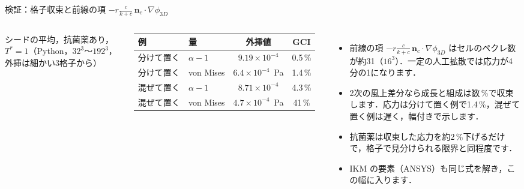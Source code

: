 \documentclass[aspectratio=169,11pt]{beamer}
\begin{document}
\begin{frame}{検証：格子収束と前線の項 $-r\tfrac{c}{k+c}\,\mathbf n_c\cdot\nabla\phi_{3D}$}
\begin{columns}[T]
\small シードの平均，抗菌薬あり，$T^*=1$（Python，$32^3$〜$192^3$，外挿は細かい3格子から）\\[4pt]
\begin{tabular}{llcc}
\toprule
例 & 量 & 外挿値 & GCI \\
\midrule
分けて置く & $\alpha-1$ & $9.19\times10^{-4}$ & 0.5\,\% \\
分けて置く & von Mises & $6.4\times10^{-4}$~Pa & 1.4\,\% \\
混ぜて置く & $\alpha-1$ & $8.71\times10^{-4}$ & 4.3\,\% \\
混ぜて置く & von Mises & $4.7\times10^{-4}$~Pa & 41\,\% \\
\bottomrule
\end{tabular}
\small
\begin{itemize}\setlength{\itemsep}{4pt}
  \item 前線の項 $-r\tfrac{c}{k+c}\,\mathbf n_c\cdot\nabla\phi_{3D}$ はセルのペクレ数が約31（$16^3$）．一定の人工拡散では応力が4分の1になります．
  \item 2次の風上差分なら成長と組成は数\,\%で収束します．応力は分けて置く例で1.4\,\%，混ぜて置く例は遅く，幅付きで示します．
  \item 抗菌薬は収束した応力を約2\,\%下げるだけで，格子で見分けられる限界と同程度です．
  \item IKM の要素（ANSYS）も同じ式を解き，この幅に入ります．
\end{itemize}
\end{columns}
\end{frame}
\end{document}
